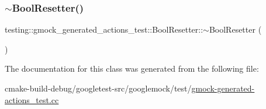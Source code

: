 \mbox{\label{classtesting_1_1gmock__generated__actions__test_1_1BoolResetter_a814afb883394b0fe7d7c8c1aa22d9cb6}} 
\subsubsection{\texorpdfstring{$\sim$BoolResetter()}{~BoolResetter()}}
{\footnotesize\ttfamily testing\+::gmock\+\_\+generated\+\_\+actions\+\_\+test\+::\+Bool\+Resetter\+::$\sim$\+Bool\+Resetter (\begin{DoxyParamCaption}{ }\end{DoxyParamCaption})\hspace{0.3cm}{\ttfamily [inline]}}



The documentation for this class was generated from the following file\+:\begin{DoxyCompactItemize}
\item 
cmake-\/build-\/debug/googletest-\/src/googlemock/test/\mbox{\hyperlink{gmock-generated-actions__test_8cc}{gmock-\/generated-\/actions\+\_\+test.\+cc}}\end{DoxyCompactItemize}
